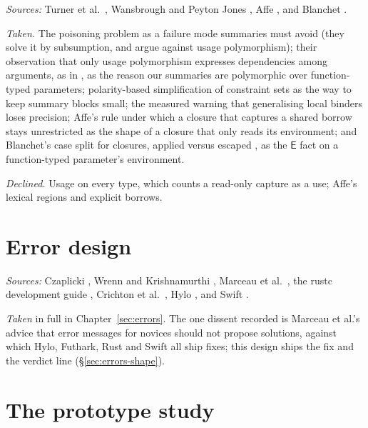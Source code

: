 \emph{Sources:} Turner et al.\ \citep{turner1995once}, Wansbrough and Peyton Jones
\citep{wansbrough1999once,wansbrough2002thesis}, Affe \citep{radanne2020kindly}, and Blanchet
\citep{blanchet1998escape}.

\emph{Taken.} The poisoning problem \citep[\S6.3]{wansbrough1999once} as a failure mode summaries must
avoid (they solve it by subsumption, and argue against usage polymorphism); their observation that only
usage polymorphism expresses dependencies among arguments, as in , as the reason our summaries
are polymorphic over function-typed parameters;
polarity-based simplification of constraint sets \citep{wansbrough2002thesis} as the way to keep summary
blocks small; the measured warning that generalising local binders loses precision; Affe's rule under
which a closure that captures a shared borrow stays unrestricted \citep[\S3.3]{radanne2020kindly} as the
shape of a closure that only reads its environment; and Blanchet's case split for closures, applied
versus escaped \citep{blanchet1998escape}, as the $\mathsf{E}$ fact on a function-typed parameter's
environment.

\emph{Declined.} Usage on every type, which counts a read-only capture as a use; Affe's lexical regions
and explicit borrows.

\section{Error design}

\emph{Sources:} Czaplicki \citep{czaplicki2015errors}, Wrenn and Krishnamurthi \citep{wrenn2017classifiers},
Marceau et al.\ \citep{marceau2011mind}, the rustc development guide \citep{rustc2026diagnostics},
Crichton et al.\ \citep{crichton2020usability,crichton2023grounded,crichton2024profiling}, Hylo
\citep{hylo2024bindings}, and Swift \citep{swift2025explicitcopies,swift2026diagnosticssil}.

\emph{Taken} in full in Chapter~\ref{sec:errors}. The one dissent recorded is Marceau et al.'s advice
that error messages for novices should not propose solutions, against which Hylo, Futhark, Rust and
Swift all ship fixes; this design ships the fix and the verdict line (\S\ref{sec:errors-shape}).

\section{The prototype study}

